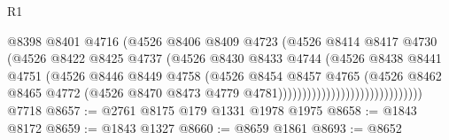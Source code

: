\begin{lexlean}{R1}
\begin{coremodule}
                                              @8398
                                              @8401
                                              @4716
                                              (@4526
                                                @8406
                                                @8409
                                                @4723
                                                (@4526
                                                  @8414
                                                  @8417
                                                  @4730
                                                  (@4526
                                                    @8422
                                                    @8425
                                                    @4737
                                                    (@4526
                                                      @8430
                                                      @8433
                                                      @4744
                                                      (@4526
                                                        @8438
                                                        @8441
                                                        @4751
                                                        (@4526
                                                          @8446
                                                          @8449
                                                          @4758
                                                          (@4526
                                                            @8454
                                                            @8457
                                                            @4765
                                                            (@4526
                                                              @8462
                                                              @8465
                                                              @4772
                                                              (@4526
                                                                @8470
                                                                @8473
                                                                @4779
                                                                @4781))))))))))))))))))))))))))))))
    @7718
@8657 := @2761 @8175 @179 @1331 @1978 @1975
@8658 := @1843 @8172
@8659 := @1843 @1327
@8660 := @8659 @1861
@8693 := @8652

\end{coremodule}
\end{lexlean}
